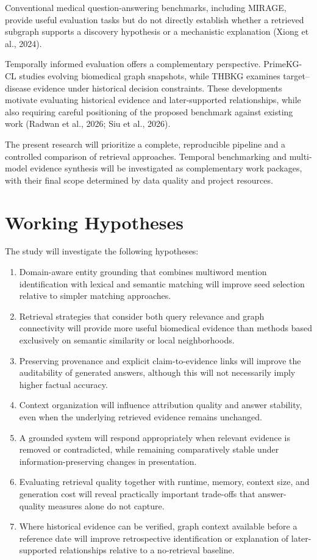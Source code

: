 Conventional medical question-answering benchmarks, including MIRAGE, provide useful evaluation tasks but do not directly establish whether a retrieved subgraph supports a discovery hypothesis or a mechanistic explanation (Xiong et al., 2024).

Temporally informed evaluation offers a complementary perspective. PrimeKG-CL studies evolving biomedical graph snapshots, while THBKG examines target--disease evidence under historical decision constraints. These developments motivate evaluating historical evidence and later-supported relationships, while also requiring careful positioning of the proposed benchmark against existing work (Radwan et al., 2026; Siu et al., 2026).

The present research will prioritize a complete, reproducible pipeline and a controlled comparison of retrieval approaches. Temporal benchmarking and multi-model evidence synthesis will be investigated as complementary work packages, with their final scope determined by data quality and project resources.

\section{Working Hypotheses}\label{working-hypotheses}

The study will investigate the following hypotheses:

\begin{enumerate}
\def\labelenumi{\arabic{enumi}.}
\item
  Domain-aware entity grounding that combines multiword mention identification with lexical and semantic matching will improve seed selection relative to simpler matching approaches.
\item
  Retrieval strategies that consider both query relevance and graph connectivity will provide more useful biomedical evidence than methods based exclusively on semantic similarity or local neighborhoods.
\item
  Preserving provenance and explicit claim-to-evidence links will improve the auditability of generated answers, although this will not necessarily imply higher factual accuracy.
\item
  Context organization will influence attribution quality and answer stability, even when the underlying retrieved evidence remains unchanged.
\item
  A grounded system will respond appropriately when relevant evidence is removed or contradicted, while remaining comparatively stable under information-preserving changes in presentation.
\item
  Evaluating retrieval quality together with runtime, memory, context size, and generation cost will reveal practically important trade-offs that answer-quality measures alone do not capture.
\item
  Where historical evidence can be verified, graph context available before a reference date will improve retrospective identification or explanation of later-supported relationships relative to a no-retrieval baseline.
\end{enumerate}

